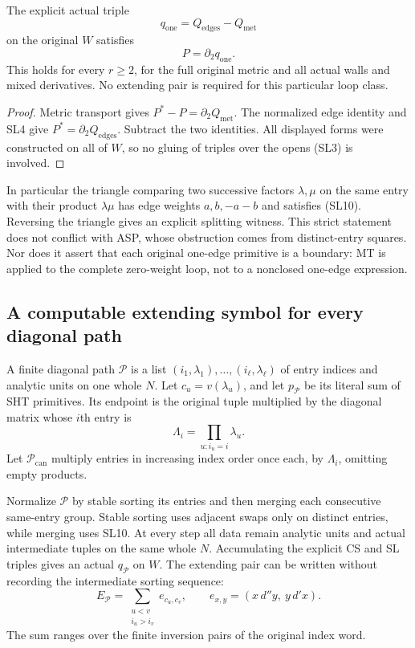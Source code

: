 \begin{theorem}
The explicit actual triple
\[
                         q_{\mathrm{one}}
                              =Q_{\mathrm{edges}}-Q_{\mathrm{met}}
 \tag{SL9}
\]
on the original $W$ satisfies
\[
                                  P=\partial_2q_{\mathrm{one}}.
 \tag{SL10}
\]
This holds for every $r\ge2$, for the full original metric and
all actual walls and mixed derivatives.  No extending pair
is required for this particular loop class.
\end{theorem}

\begin{proof}
Metric transport gives $P^*-P=\partial_2Q_{\mathrm{met}}$.
The normalized edge identity and SL4 give
$P^*=\partial_2Q_{\mathrm{edges}}$.  Subtract the two identities.
All displayed forms were constructed on all of $W$, so no
gluing of triples over the opens (SL3) is involved.
\end{proof}

In particular the triangle comparing two successive factors
$\lambda,\mu$ on the same entry with their product $\lambda\mu$
has edge weights $a,b,-a-b$ and satisfies (SL10).  Reversing
the triangle gives an explicit splitting witness.  This strict
statement does not conflict with ASP, whose obstruction comes
from distinct-entry squares.  Nor does it assert that each
original one-edge primitive is a boundary: MT is applied to
the complete zero-weight loop, not to a nonclosed one-edge
expression.

\subsection{A computable extending symbol for every diagonal path}

A finite diagonal path $\mathcal P$ is a list
$(i_1,\lambda_1),\ldots,(i_\ell,\lambda_\ell)$ of entry indices
and analytic units on one whole $N$.  Let $c_u=v(\lambda_u)$,
and let $p_{\mathcal P}$ be its literal sum of SHT primitives.
Its endpoint is the original tuple multiplied by the diagonal
matrix whose $i$th entry is
\[
                        \Lambda_i=\prod_{u:i_u=i}\lambda_u .
 \tag{SL11}
\]
Let $\mathcal P_{\mathrm{can}}$ multiply entries in increasing
index order once each, by $\Lambda_i$, omitting empty products.

Normalize $\mathcal P$ by stable sorting its entries and then
merging each consecutive same-entry group.  Stable sorting
uses adjacent swaps only on distinct entries, while merging
uses SL10.  At every step all data remain analytic units and
actual intermediate tuples on the same whole $N$.  Accumulating
the explicit CS and SL triples gives an actual
$q_{\mathcal P}$ on $W$.  The extending pair can be written
without recording the intermediate sorting sequence:
\[
 E_{\mathcal P}
       =\sum_{\substack{u<v\\i_u>i_v}} e_{c_u,c_v},
 \qquad e_{x,y}=(x\,d''y,\ y\,d'x).
 \tag{SL12}
\]
The sum ranges over the finite inversion pairs of the original
index word.

